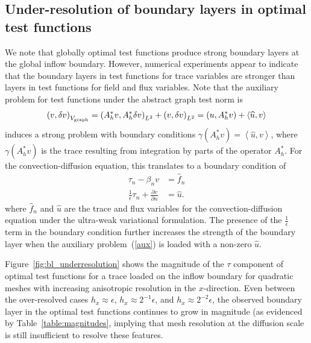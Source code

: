 \documentclass[11pt,onecolumn]{scrartcl}
\newcommand{\LRp}[1]{\left( #1 \right)}
\newcommand{\LRa}[1]{\left\langle #1 \right\rangle}
\newcommand{\uh}{\widehat{u}}
\newcommand{\fnh}{\widehat{f}_n}
\newcommand{\pd}[2]{\frac{\partial#1}{\partial#2}}
\begin{document}
\subsection{Under-resolution of boundary layers in optimal test functions}
\label{ShishkinSection}
We note that globally optimal test functions produce strong boundary layers at the global inflow boundary.  However, numerical experiments appear to indicate that the boundary layers in test functions for trace variables are stronger than layers in test functions for field and flux variables.  Note that the auxiliary problem for test functions under the abstract graph test norm is
\[
\LRp{v,\delta v}_{V_{\rm graph}} = \LRp{A^*_h v, A^*_h \delta v}_{L^2} + \LRp{v,\delta v}_{L^2} = \LRp{u,A^*_h v} + \LRa{\uh, v}
\]
induces a strong problem with boundary conditions $\gamma(A^*_h v) = \LRa{\uh, v}$, where $\gamma(A^*_hv)$ is the trace resulting from integration by parts of the operator $A^*_h$.  For the convection-diffusion equation, this translates to a boundary condition of 
\begin{align*}
\tau_n - \beta_n v  &= \fnh\\
\frac{1}{\epsilon}\tau_n + \pd{v}{n} &= \uh.
\end{align*}
where $\fnh$ and $\uh$ are the trace and flux variables for the convection-diffusion equation under the ultra-weak variational formulation.  The presence of the $\frac{1}{\epsilon}$ term in the boundary condition further increases the strength of the boundary layer when the auxiliary problem~(\ref{aux}) is loaded with a non-zero $\uh$.  

Figure~\ref{fig:bl_underresolution} shows the magnitude of the $\tau$ component of optimal test functions for a trace loaded on the inflow boundary for quadratic meshes with increasing anisotropic resolution in the $x$-direction.  Even between the over-resolved cases $h_x \approx \epsilon$, $h_x \approx 2^{-1}\epsilon$, and $h_x \approx 2^{-2}\epsilon$, the observed boundary layer in the optimal test functions continues to grow in magnitude (as evidenced by Table~\ref{table:magnitudes}, implying that mesh resolution at the diffusion scale is still insufficient to resolve these features.  
\end{document}

